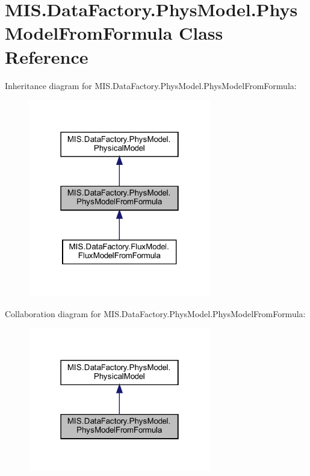 \hypertarget{classMIS_1_1DataFactory_1_1PhysModel_1_1PhysModelFromFormula}{}\section{M\+I\+S.\+Data\+Factory.\+Phys\+Model.\+Phys\+Model\+From\+Formula Class Reference}
\label{classMIS_1_1DataFactory_1_1PhysModel_1_1PhysModelFromFormula}


Inheritance diagram for M\+I\+S.\+Data\+Factory.\+Phys\+Model.\+Phys\+Model\+From\+Formula\+:
\nopagebreak
\begin{figure}[H]
\begin{center}
\leavevmode
\includegraphics[width=226pt]{classMIS_1_1DataFactory_1_1PhysModel_1_1PhysModelFromFormula__inherit__graph}
\end{center}
\end{figure}


Collaboration diagram for M\+I\+S.\+Data\+Factory.\+Phys\+Model.\+Phys\+Model\+From\+Formula\+:
\nopagebreak
\begin{figure}[H]
\begin{center}
\leavevmode
\includegraphics[width=226pt]{classMIS_1_1DataFactory_1_1PhysModel_1_1PhysModelFromFormula__coll__graph}
\end{center}
\end{figure}
